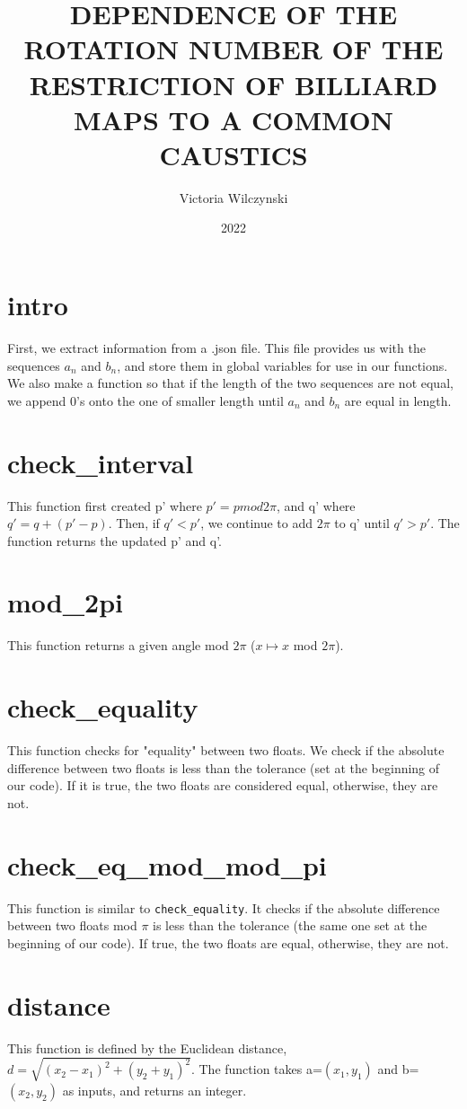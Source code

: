 \documentclass{article}
\title{DEPENDENCE OF THE ROTATION NUMBER OF THE RESTRICTION OF BILLIARD MAPS TO A COMMON CAUSTICS}
\author{Victoria Wilczynski}
\date{2022}
\begin{document}
\maketitle
\section*{intro}
First, we extract information from a .json file. This file provides us with the sequences $a_n$ and $b_n$, and store them in global variables for use in our functions. We also make a function so that if the length of the two sequences are not equal, we append 0's onto the one of smaller length until $a_n$ and $b_n$ are equal in length.

\section*{check\_interval}
This function first created p' where $p' = p mod 2\pi$, and q' where $q'=q+(p'-p)$. Then, if $q'<p'$, we continue to add $2\pi$ to q' until $q'>p'$. The function returns the updated p' and q'.

\section*{mod\_2pi}
This function returns a given angle mod $2\pi$ ($x \mapsto x$ mod $2\pi$).

\section*{check\_equality}
This function checks for "equality" between two floats. We check if the absolute difference between two floats is less than the tolerance (set at the beginning of our code). If it is true, the two floats are considered equal, otherwise, they are not.

\section*{check\_eq\_mod\_mod\_pi}
This function is similar to \verb|check_equality|. It checks if the absolute difference between two floats mod $\pi$ is less than the tolerance (the same one set at the beginning of our code). If true, the two floats are equal, otherwise, they are not.

\section*{distance}
This function is defined by the Euclidean distance, $d = \sqrt{(x_2-x_1)^2 + (y_2+y_1)^2}$. The function takes a=$(x_1,y_1)$ and b=$(x_2,y_2)$ as inputs, and returns an integer.
\end{document}
